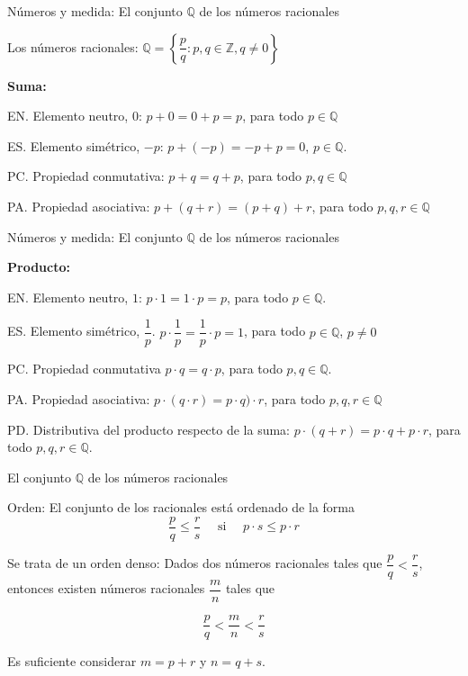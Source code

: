 \documentclass[ignorenonframetext,]{beamer}
\begin{document}
\begin{frame}{Números y medida: El conjunto \(\mathbb{Q}\) de los
números racionales}
\protect\hypertarget{nuxfameros-y-medida-el-conjunto-mathbbq-de-los-nuxfameros-racionales}{}

Los números racionales:
\(\mathbb{Q} = \left\{ \dfrac{p}{q}: p,q \in \mathbb{Z}, q \neq 0 \right\}\)

\textbf{Suma:}

EN. Elemento neutro, \(0\): \(p+0=0+p=p\), para todo
\(p \in \mathbb{Q}\)

ES. Elemento simétrico, \(-p\): \(p +(-p) = -p+p = 0\),
\(p \in \mathbb{Q}\).

PC. Propiedad conmutativa: \(p+q =q+p\), para todo
\(p,q \in \mathbb{Q}\)

PA. Propiedad asociativa: \(p+(q+r) = (p+q)+r\), para todo
\(p,q,r \in \mathbb{Q}\)

\end{frame}

\begin{frame}{Números y medida: El conjunto \(\mathbb{Q}\) de los
números racionales}
\protect\hypertarget{nuxfameros-y-medida-el-conjunto-mathbbq-de-los-nuxfameros-racionales-1}{}

\textbf{Producto:}

EN. Elemento neutro, \(1\): \(p \cdot 1 = 1 \cdot p =p\), para todo
\(p \in \mathbb{Q}\).

ES. Elemento simétrico, \(\dfrac{1}{p}\).
\(p \cdot \dfrac{1}{p} = \dfrac{1}{p} \cdot p =1\), para todo
\(p \in \mathbb{Q}\), \(p \neq 0\)

PC. Propiedad conmutativa \(p \cdot q = q \cdot p\), para todo
\(p,q \in \mathbb{Q}\).

PA. Propiedad asociativa: \(p\cdot (q \cdot r) = p \cdot q)\cdot r\),
para todo \(p,q,r \in \mathbb{Q}\)

PD. Distributiva del producto respecto de la suma:
\(p \cdot (q+r) = p \cdot q + p \cdot r\), para todo
\(p,q,r \in \mathbb{Q}\).

\end{frame}

\begin{frame}{El conjunto \(\mathbb{Q}\) de los números racionales}
\protect\hypertarget{el-conjunto-mathbbq-de-los-nuxfameros-racionales}{}

Orden: El conjunto de los racionales está ordenado de la forma \[
\dfrac{p}{q} \leq \dfrac{r}{s} \quad \text{ si } \quad  p\cdot  s \leq p \cdot r
\]

Se trata de un orden denso: Dados dos números racionales tales que
\(\dfrac{p}{q} < \dfrac{r}{s}\), entonces existen números racionales
\(\dfrac{m}{n}\) tales que

\[
\dfrac{p}{q} < \dfrac{m}{n} < \dfrac{r}{s}
\]

Es suficiente considerar \(m=p+r\) y \(n=q+s\).

\end{frame}
\end{document}
